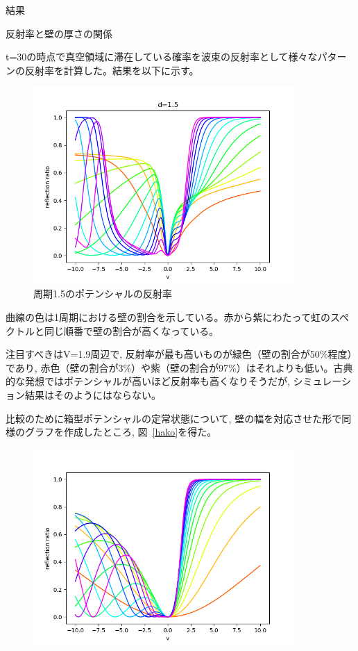 \documentclass[a4paper, lualatex]{bxjsarticle}
\newcommand{\fref}[1]{図~\ref{#1}}
\begin{document}
\begin{section}{結果}
    \begin{subsection}{反射率と壁の厚さの関係}
        \par t=30の時点で真空領域に滞在している確率を波束の反射率として様々なパターンの反射率を計算した。結果を以下に示す。
        \begin{figure}[h]
            \centering
            \includegraphics[width=10cm]{hansha.png}
            \caption{周期1.5のポテンシャルの反射率}
            \label{hansha}
        \end{figure}
        \par 曲線の色は1周期における壁の割合を示している。赤から紫にわたって虹のスペクトルと同じ順番で壁の割合が高くなっている。
        \par 注目すべきはV=1.9周辺で, 反射率が最も高いものが緑色（壁の割合が50\%程度）であり, 赤色（壁の割合が3\%）や紫（壁の割合が97\%）はそれよりも低い。古典的な発想ではポテンシャルが高いほど反射率も高くなりそうだが, シミュレーション結果はそのようにはならない。
        \par 比較のために箱型ポテンシャルの定常状態について, 壁の幅を対応させた形で同様のグラフを作成したところ, \fref{hako}を得た。
        \newpage
        \begin{figure}[h]
            \centering
            \includegraphics[width=10cm]{hako.png}

\end{figure}
\end{subsection}
\end{section}
\end{document}
